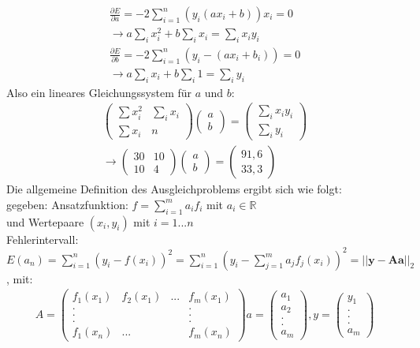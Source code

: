 \documentclass{scrartcl}
\begin{document}
\begin{align*}
\frac{\partial E}{\partial a} = -2 \sum_{i=1}^n (y_i(a x_i+b))x_i=0 \\
\rightarrow a \sum_i x_i^2+ b \sum_i x_i=\sum_i x_i y_i \\
\frac{\partial E}{\partial b} = -2 \sum_{i=1}^n (y_i-(a x_i + b_i))=0 \\
\rightarrow a \sum_i x_i + b \sum_i 1=\sum_i y_i
\end{align*}
Also ein lineares Gleichungssystem für $a$ und $b$:
\begin{align*}
\begin{pmatrix}
\sum x_i^2 & \sum_i x_i \\
\sum x_i & n
\end{pmatrix}
\begin{pmatrix}
a \\
b
\end{pmatrix} = \begin{pmatrix}
\sum_i x_i y_i \\
\sum_i y_i
\end{pmatrix} \\
\rightarrow
\begin{pmatrix}
30 & 10 \\
10 & 4
\end{pmatrix}
\begin{pmatrix}
a \\
b
\end{pmatrix} = \begin{pmatrix}
91,6 \\
33,3
\end{pmatrix}
\end{align*}
Die allgemeine Definition des Ausgleichproblems ergibt sich wie folgt:\\
gegeben: Ansatzfunktion: $f=\sum_{i=1}^m a_i f_i$ mit $a_i \in \mathbb{R}$\\
und Wertepaare $(x_i, y_i)$ mit $i=1...n$ \\
Fehlerintervall: $E(a_n)=\sum_{i=1}^n (y_i-f(x_i))^2=\sum_{i=1}^n(y_i-\sum_{j=1}^m a_j f_j(x_i))^2=||\boldsymbol{y}-\boldsymbol{A \boldsymbol{a}}||_2$, mit:
\begin{align*}
A=\begin{pmatrix}
f_1(x_1) & f_2(x_1) & ... & f_m(x_1)\\
. & & & .\\
. & & & .\\
. & & & .\\
f_1(x_n) & ... & &f_m(x_n)
\end{pmatrix}
a = \begin{pmatrix}
a_1 \\
a_2 \\
.\\
.\\
a_m
\end{pmatrix},
y= \begin{pmatrix}
y_1 \\
.\\
.\\
.\\
a_m
\end{pmatrix}
\end{align*}
\end{document}
